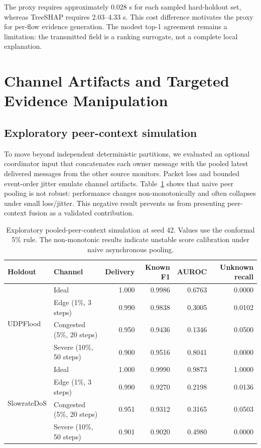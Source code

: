 The proxy requires approximately 0.028 s for each sampled hard-holdout set, whereas TreeSHAP requires 2.03--4.33 s. This cost difference motivates the proxy for per-flow evidence generation. The modest top-1 agreement remains a limitation: the transmitted field is a ranking surrogate, not a complete local explanation.

\section{Channel Artifacts and Targeted Evidence Manipulation}

\subsection{Exploratory peer-context simulation}

To move beyond independent deterministic partitions, we evaluated an optional coordinator input that concatenates each owner message with the pooled latest delivered messages from the other source monitors. Packet loss and bounded event-order jitter emulate channel artifacts. Table~\ref{tab:network} shows that naive peer pooling is not robust: performance changes non-monotonically and often collapses under small loss/jitter. This negative result prevents us from presenting peer-context fusion as a validated contribution.

\begin{table}[H]
\caption{Exploratory pooled-peer-context simulation at seed 42. Values use the conformal 5\% rule. The non-monotonic results indicate unstable score calibration under naive asynchronous pooling.}
\label{tab:network}
\centering
\small
\begin{tabular}{llrrrr}
\toprule
Holdout & Channel & Delivery & Known F1 & AUROC & Unknown recall \\
\midrule
\multirow{4}{*}{UDPFlood}
& Ideal & 1.000 & 0.9986 & 0.6763 & 0.0000 \\
& Edge (1\%, 3 steps) & 0.990 & 0.9838 & 0.3005 & 0.0102 \\
& Congested (5\%, 20 steps) & 0.950 & 0.9436 & 0.1346 & 0.0500 \\
& Severe (10\%, 50 steps) & 0.900 & 0.9516 & 0.8041 & 0.0000 \\
\midrule
\multirow{4}{*}{SlowrateDoS}
& Ideal & 1.000 & 0.9990 & 0.9873 & 1.0000 \\
& Edge (1\%, 3 steps) & 0.990 & 0.9270 & 0.2198 & 0.0136 \\
& Congested (5\%, 20 steps) & 0.951 & 0.9312 & 0.3165 & 0.0503 \\
& Severe (10\%, 50 steps) & 0.901 & 0.9020 & 0.4980 & 0.0000 \\
\bottomrule
\end{tabular}
\end{table}

